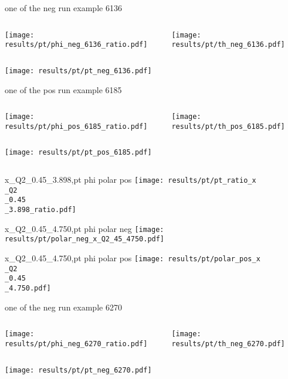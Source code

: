 \begin{frame}{one of the neg run example 6136}
\begin{columns}
\begin{column}[T]{0.5\textwidth}
\texttt{[image: results/pt/phi\_neg\_6136\_ratio.pdf]}
\end{column}
\begin{column}[T]{0.5\textwidth}
\texttt{[image: results/pt/th\_neg\_6136.pdf]}
\end{column}
\end{columns}
\texttt{[image: results/pt/pt\_neg\_6136.pdf]}
\end{frame}
\begin{frame}{one of the pos run example 6185}
\begin{columns}
\begin{column}[T]{0.5\textwidth}
\texttt{[image: results/pt/phi\_pos\_6185\_ratio.pdf]}
\end{column}
\begin{column}[T]{0.5\textwidth}
\texttt{[image: results/pt/th\_pos\_6185.pdf]}
\end{column}
\end{columns}
\begin{columns}
\begin{column}[T]{0.5\textwidth}
\texttt{[image: results/pt/pt\_pos\_6185.pdf]}
\end{column}
\begin{column}[T]{0.5\textwidth}
\end{column}
\end{columns}
\end{frame}
\begin{frame}{x\_Q2\_0.45\_3.898,pt phi polar pos}
\texttt{[image: results/pt/pt\_ratio\_x\\\_Q2\\\_0.45\\\_3.898\_ratio.pdf]}
\end{frame}
\begin{frame}{x\_Q2\_0.45\_4.750,pt phi polar neg}
\texttt{[image: results/pt/polar\_neg\_x\_Q2\_45\_4750.pdf]}
\end{frame}
\begin{frame}{x\_Q2\_0.45\_4.750,pt phi polar pos}
\texttt{[image: results/pt/polar\_pos\_x\\\_Q2\\\_0.45\\\_4.750.pdf]}
\end{frame}
\begin{frame}{one of the neg run example 6270}
\begin{columns}
\begin{column}[T]{0.5\textwidth}
\texttt{[image: results/pt/phi\_neg\_6270\_ratio.pdf]}
\end{column}
\begin{column}[T]{0.5\textwidth}
\texttt{[image: results/pt/th\_neg\_6270.pdf]}
\end{column}
\end{columns}
\texttt{[image: results/pt/pt\_neg\_6270.pdf]}
\end{frame}
